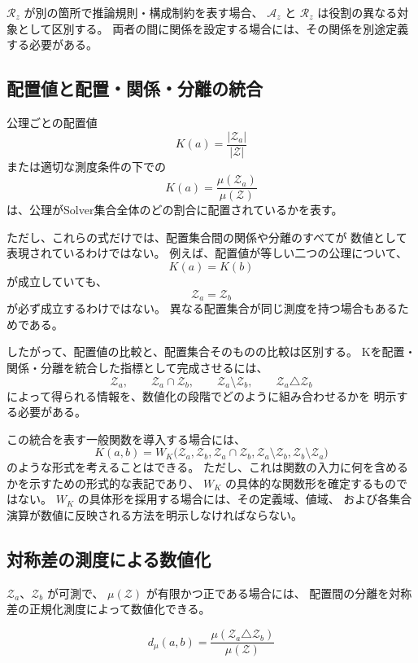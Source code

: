 \documentclass[a4paper,12pt]{article}
\begin{document}
$\mathcal{R}_z$ が別の箇所で推論規則・構成制約を表す場合、
$\mathcal{A}_z$ と $\mathcal{R}_z$ は役割の異なる対象として区別する。
両者の間に関係を設定する場合には、その関係を別途定義する必要がある。

\subsection{配置値と配置・関係・分離の統合}

公理ごとの配置値
\[
    K(a)=\frac{|\mathcal{Z}_a|}{|\mathcal{Z}|}
\]
または適切な測度条件の下での
\[
    K(a)=\frac{\mu(\mathcal{Z}_a)}{\mu(\mathcal{Z})}
\]
は、公理がSolver集合全体のどの割合に配置されているかを表す。

ただし、これらの式だけでは、配置集合間の関係や分離のすべてが
数値として表現されているわけではない。
例えば、配置値が等しい二つの公理について、
\[
    K(a)=K(b)
\]
が成立していても、
\[
    \mathcal{Z}_a=\mathcal{Z}_b
\]
が必ず成立するわけではない。
異なる配置集合が同じ測度を持つ場合もあるためである。

したがって、配置値の比較と、配置集合そのものの比較は区別する。
Kを配置・関係・分離を統合した指標として完成させるには、
\[
    \mathcal{Z}_a,\qquad
    \mathcal{Z}_a\cap\mathcal{Z}_b,\qquad
    \mathcal{Z}_a\setminus\mathcal{Z}_b,\qquad
    \mathcal{Z}_a\triangle\mathcal{Z}_b
\]
によって得られる情報を、数値化の段階でどのように組み合わせるかを
明示する必要がある。

この統合を表す一般関数を導入する場合には、
\[
    K(a,b)
    =
    W_K\bigl(
        \mathcal{Z}_a,
        \mathcal{Z}_b,
        \mathcal{Z}_a\cap\mathcal{Z}_b,
        \mathcal{Z}_a\setminus\mathcal{Z}_b,
        \mathcal{Z}_b\setminus\mathcal{Z}_a
    \bigr)
\]
のような形式を考えることはできる。
ただし、これは関数の入力に何を含めるかを示すための形式的な表記であり、
$W_K$ の具体的な関数形を確定するものではない。
$W_K$ の具体形を採用する場合には、その定義域、値域、
および各集合演算が数値に反映される方法を明示しなければならない。

\subsection{対称差の測度による数値化}

$\mathcal{Z}_a$、$\mathcal{Z}_b$ が可測で、
$\mu(\mathcal{Z})$ が有限かつ正である場合には、
配置間の分離を対称差の正規化測度によって数値化できる。

\[
    d_\mu(a,b)
    =
    \frac{
        \mu(\mathcal{Z}_a\triangle\mathcal{Z}_b)
    }{
        \mu(\mathcal{Z})
    }
\]
\end{document}
